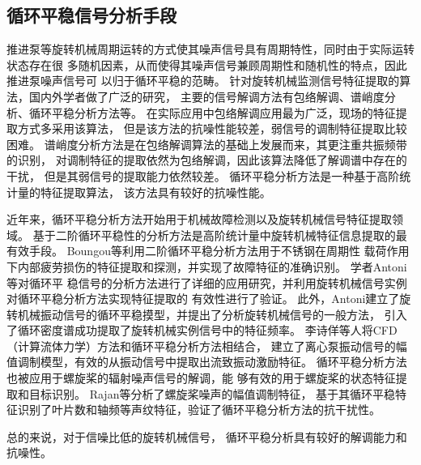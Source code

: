 \subsection{循环平稳信号分析手段}
推进泵等旋转机械周期运转的方式使其噪声信号具有周期特性，同时由于实际运转状态存在很
多随机因素，从而使得其噪声信号兼顾周期性和随机性的特点，因此推进泵噪声信号可
以归于循环平稳的范畴\cite{陈进2013机械故障特征提取的循环平稳理论及方法}。
针对旋转机械监测信号特征提取的算法，国内外学者做了广泛的研究，
主要的信号解调方法有包络解调、谱峭度分析、循环平稳分析方法等\cite{wangSpectralKurtosisFault2016}。
在实际应用中包络解调应用最为广泛，现场的特征提取方式多采用该算法，
但是该方法的抗噪性能较差，弱信号的调制特征提取比较困难\cite{abboudEnvelopeAnalysisRotating2017,2014The}。
谱峭度分析方法是在包络解调算法的基础上发展而来，其更注重共振频带的识别，
对调制特征的提取依然为包络解调，因此该算法降低了解调谱中存在的干扰，
但是其弱信号的提取能力依然较差\cite{2007Fast,2011A}。
循环平稳分析方法是一种基于高阶统计量的特征提取算法，
该方法具有较好的抗噪性能\cite{gardnerCyclostationarityHalfCentury2006,songRobustPassiveUnderwater2019}。

近年来，循环平稳分析方法开始用于机械故障检测以及旋转机械信号特征提取领域\cite{2006Detecting,poirierExtrapolationDynamicLoad2017,fengGearDamageAssessment2011,何俊2007,antoniCyclicSpectralAnalysis2007a,2017Extrapolation}。
基于二阶循环平稳性的分析方法是高阶统计量中旋转机械特征信息提取的最有效手段\cite{antoniUseCyclicPower2005}。
Boungou等\cite{boungouFatigueDamageDetection2015}利用二阶循环平稳分析方法用于不锈钢在周期性
载荷作用下内部疲劳损伤的特征提取和探测，并实现了故障特征的准确识别。
学者Antoni等\cite{antoniCyclostationarityExamples2009}对循环平
稳信号的分析方法进行了详细的应用研究，并利用旋转机械信号实例对循环平稳分析方法实现特征提取的
有效性进行了验证。
此外，Antoni建立了旋转机械振动信号的循环平稳摸型，并提出了分析旋转机械信号的一般方法，
引入了循环密度谱成功提取了旋转机械实例信号中的特征频率\cite{antoniCyclostationaryModellingRotating2004a}。
李诗佯等\cite{2019Cyclostationary}人将CFD（计算流体力学）方法和循环平稳分析方法相结合，
建立了离心泵振动信号的幅值调制模型，有效的从振动信号中提取出流致振动激励特征。
循环平稳分析方法也被应用于螺旋桨的辐射噪声信号的解调，能
够有效的用于螺旋桨的状态特征提取和目标识别\cite{antoniDetectionSurfaceShips2012,2016Cyclostationary}。
Rajan等\cite{rajanCyclostationarityBasedSonar2016}分析了螺旋桨噪声的幅值调制特征，
基于其循环平稳特征识别了叶片数和轴频等声纹特征，验证了循环平稳分析方法的抗干扰性。

总的来说，对于信噪比低的旋转机械信号，
循环平稳分析具有较好的解调能力和抗噪性。

